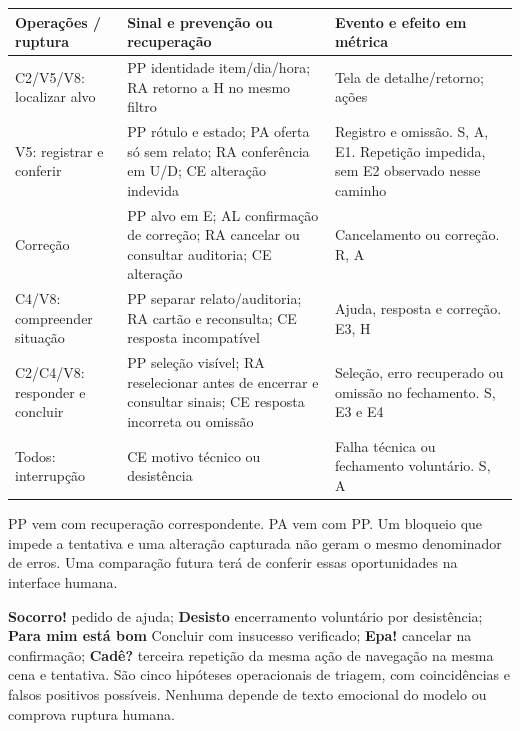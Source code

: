 \begin{center}\small
\begin{tabularx}{\columnwidth}{@{}P{.22\columnwidth}YY@{}}\toprule
Operações / ruptura & Sinal e prevenção ou recuperação & Evento e efeito em métrica\\\midrule
C2/V5/V8: localizar alvo & PP identidade item/dia/hora; RA retorno a H no mesmo filtro & Tela de detalhe/retorno; ações\\
V5: registrar e conferir & PP rótulo e estado; PA oferta só sem relato; RA conferência em U/D; CE alteração indevida & Registro e omissão. S, A, E1. Repetição impedida, sem E2 observado nesse caminho\\
Correção & PP alvo em E; AL confirmação de correção; RA cancelar ou consultar auditoria; CE alteração & Cancelamento ou correção. R, A\\
C4/V8: compreender situação & PP separar relato/auditoria; RA cartão e reconsulta; CE resposta incompatível & Ajuda, resposta e correção. E3, H\\
C2/C4/V8: responder e concluir & PP seleção visível; RA reselecionar antes de encerrar e consultar sinais; CE resposta incorreta ou omissão & Seleção, erro recuperado ou omissão no fechamento. S, E3 e E4\\
Todos: interrupção & CE motivo técnico ou desistência & Falha técnica ou fechamento voluntário. S, A\\\bottomrule
\end{tabularx}
\end{center}

PP vem com recuperação correspondente. PA vem com PP. Um bloqueio que impede a tentativa e uma alteração capturada não geram o mesmo denominador de erros. Uma comparação futura terá de conferir essas oportunidades na interface humana.

 \textbf{Socorro!} pedido de ajuda; \textbf{Desisto} encerramento voluntário por desistência; \textbf{Para mim está bom} Concluir com insucesso verificado; \textbf{Epa!} cancelar na confirmação; \textbf{Cadê?} terceira repetição da mesma ação de navegação na mesma cena e tentativa. São cinco hipóteses operacionais de triagem, com coincidências e falsos positivos possíveis. Nenhuma depende de texto emocional do modelo ou comprova ruptura humana.

